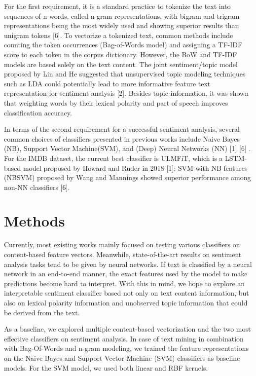 \documentclass{article}
\begin{document}
For the first requirement, it is a standard practice to tokenize the text into sequences of n words, called n-gram representations, with bigram and trigram representations being the most widely used and showing superior results than unigram tokens [6]. To vectorize a tokenized text, common methods include counting the token occurrences (Bag-of-Words model) and assigning a TF-IDF score to each token in the corpus dictionary. However, the BoW and TF-IDF models are based solely on the text content. The joint sentiment/topic model proposed by Lin and He suggested that unsupervised topic modeling techniques such as LDA could potentially lead to more informative feature text representation for sentiment analysis [2]. Besides topic information, it was shown that weighting words by their lexical polarity and part of speech improves classification accuracy. 



In terms of the second requirement for a successful sentiment analysis, several common choices of classifiers presented in previous works include Naive Bayes (NB), Support Vector Machine(SVM), and (Deep) Neural Networks (NN) [1] [6] . For the IMDB dataset, the current best classifier is ULMFiT, which is a LSTM-based model proposed by Howard and Ruder in 2018 [1]; SVM with NB features (NBSVM) proposed by Wang and Mannings showed superior performance among non-NN classifiers [6].


\section{Methods}

Currently, most existing works mainly focused on testing various classifiers on content-based feature vectors. Meanwhile, state-of-the-art results on sentiment analysis tasks tend to be given by neural networks. If text is classified by a neural network in an end-to-end manner, the exact features used by the model to make predictions become hard to interpret. With this in mind, we hope to explore an interpretable sentiment classifier based not only on text content information, but also on lexical polarity information and unobserved topic information that could be derived from the text.

As a baseline, we explored multiple content-based vectorization and the two most effective classifiers on sentiment analysis. In case of text mining in combination with Bag-Of-Words and n-gram modeling, we trained the feature representations on the Naive Bayes and Support Vector Machine (SVM) classifiers as baseline models. For the SVM model, we used both linear and RBF kernels.
\end{document}
